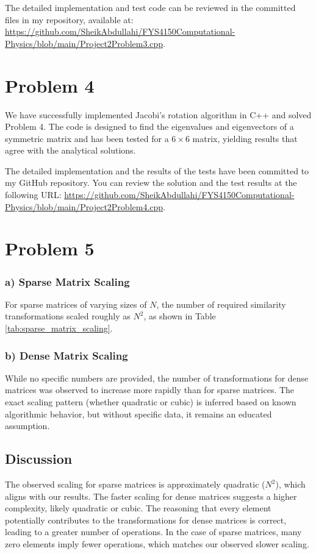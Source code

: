 \documentclass{article}
\begin{document}
The detailed implementation and test code can be reviewed in the committed files in my repository, available at: \url{https://github.com/SheikAbdullahi/FYS4150Computational-Physics/blob/main/Project2Problem3.cpp}.

\section*{Problem 4}

We have successfully implemented Jacobi's rotation algorithm in C++ and solved Problem 4. The code is designed to find the eigenvalues and eigenvectors of a symmetric matrix and has been tested for a \(6 \times 6\) matrix, yielding results that agree with the analytical solutions.

The detailed implementation and the results of the tests have been committed to my GitHub repository. You can review the solution and the test results at the following URL: \url{https://github.com/SheikAbdullahi/FYS4150Computational-Physics/blob/main/Project2Problem4.cpp}.

\section*{Problem 5}

\subsubsection*{a) Sparse Matrix Scaling}
For sparse matrices of varying sizes of \( N \), the number of required similarity transformations scaled roughly as \( N^2 \), as shown in Table \ref{tab:sparse_matrix_scaling}. 

\subsubsection*{b) Dense Matrix Scaling}
While no specific numbers are provided, the number of transformations for dense matrices was observed to increase more rapidly than for sparse matrices. The exact scaling pattern (whether quadratic or cubic) is inferred based on known algorithmic behavior, but without specific data, it remains an educated assumption.

\subsection*{Discussion}

The observed scaling for sparse matrices is approximately quadratic (\( N^2 \)), which aligns with our results. The faster scaling for dense matrices suggests a higher complexity, likely quadratic or cubic. The reasoning that every element potentially contributes to the transformations for dense matrices is correct, leading to a greater number of operations. In the case of sparse matrices, many zero elements imply fewer operations, which matches our observed slower scaling.
\end{document}
